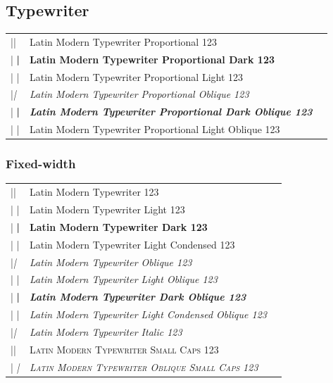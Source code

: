 \documentclass[a4paper]{article}
\makeatletter
\newenvironment{vrb}{\begin{tabular}{@{}p{5.4cm}ll@{}}}{\end{tabular}}
\makeatother
\begin{document}
\subsection*{Typewriter}

\ttfamily
\tvstyle
\begin{vrb}
|\ttfamily\tvstyle | & {Latin Modern Typewriter Proportional 123} \\
|  \bfseries | & {\bfseries Latin Modern Typewriter Proportional Dark 123} \\
|  \lgweight | & {\lgweight Latin Modern Typewriter Proportional Light 123} \\
|\slshape | & {\slshape Latin Modern Typewriter Proportional Oblique 123} \\
|  \bfseries | & {\bfseries\slshape Latin Modern Typewriter Proportional Dark Oblique 123} \\
|  \lgweight | & {\lgweight Latin Modern Typewriter Proportional Light Oblique 123} \\
\end{vrb}

\subsubsection*{Fixed-width}

\tmstyle
\begin{vrb}
|\ttfamily\tmstyle | & {Latin Modern Typewriter 123} \\
|  \lgweight | & {\lgweight Latin Modern Typewriter Light 123} \\
|  \bfseries | & {\bfseries Latin Modern Typewriter Dark 123} \\
|  \fontseries{lc}\selectfont | & {\fontseries{lc}\selectfont Latin Modern Typewriter Light Condensed 123} \\
|\slshape | & {\slshape Latin Modern Typewriter Oblique 123} \\
|  \lgweight | & {\lgweight\slshape Latin Modern Typewriter Light Oblique 123} \\
|  \bfseries | & {\bfseries\slshape Latin Modern Typewriter Dark Oblique 123} \\
|  \fontseries{lc} | & {\fontseries{lc}\slshape Latin Modern Typewriter Light Condensed Oblique 123} \\
|\itshape | & {\itshape Latin Modern Typewriter Italic 123} \\
|\scshape | & {\scshape Latin Modern Typewriter Small Caps 123} \\
|  \slshape | & {\scshape\slshape Latin Modern Typewriter Oblique Small Caps 123} \\
\end{vrb}
\end{document}
